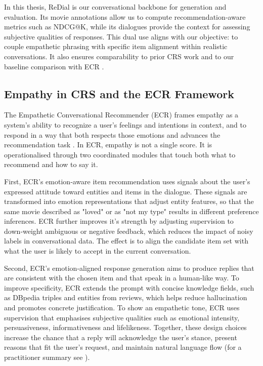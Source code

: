 \documentclass[12pt]{article}
\begin{document}
  In this thesis, ReDial is our conversational backbone for generation and evaluation. Its movie annotations allow us to compute recommendation‑aware metrics such as NDCG@K, while its dialogues provide the context for assessing subjective qualities of responses. This dual use aligns with our objective: to couple empathetic phrasing with specific item alignment within realistic conversations. It also ensures comparability to prior CRS work and to our baseline comparison with ECR \citep{zhang2024ecr}.
  
  \subsection{Empathy in CRS and the ECR Framework}
  The Empathetic Conversational Recommender (ECR) frames empathy as a system's ability to recognize a user's feelings and intentions in context, and to respond in a way that both respects those emotions and advances the recommendation task \citep{zhang2024ecr}. In ECR, empathy is not a single score. It is operationalised through two coordinated modules that touch both what to recommend and how to say it.

  First, ECR's emotion‑aware item recommendation uses signals about the user's expressed attitude toward entities and items in the dialogue. These signals are transformed into emotion representations that adjust entity features, so that the same movie described as "loved" or as "not my type" results in different preference inferences. ECR further improves it's strength by adjusting supervision to down‑weight ambiguous or negative feedback, which reduces the impact of noisy labels in conversational data. The effect is to align the candidate item set with what the user is likely to accept in the current conversation.

  Second, ECR's emotion‑aligned response generation aims to produce replies that are consistent with the chosen item and that speak in a human‑like way. To improve specificity, ECR extends the prompt with concise knowledge fields, such as DBpedia triples and entities from reviews, which helps reduce hallucination and promotes concrete justification. To show an empathetic tone, ECR uses supervision that emphasises subjective qualities such as emotional intensity, persuasiveness, informativeness and lifelikeness. Together, these design choices increase the chance that a reply will acknowledge the user's stance, present reasons that fit the user's request, and maintain natural language flow \citep{zhang2024ecr} (for a practitioner summary see \citealp{shaped_ecr_blog}).
\end{document}
